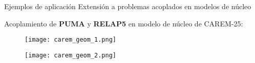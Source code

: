 \normalsize
\begin{frame}
{Ejemplos de aplicación}
{Extensión a problemas acoplados en modelos de núcleo}

Acoplamiento de \textbf{PUMA} y \textbf{RELAP5} en modelo de núcleo de CAREM-25:

\begin{figure}[ht]
	\begin{minipage}{0.48\linewidth}
      \centering
      \texttt{[image: carem\_geom\_1.png]}
	\end{minipage}
	\begin{minipage}{0.48\linewidth}
		\centering
		\texttt{[image: carem\_geom\_2.png]}
	\end{minipage}
\end{figure}

\end{frame}



